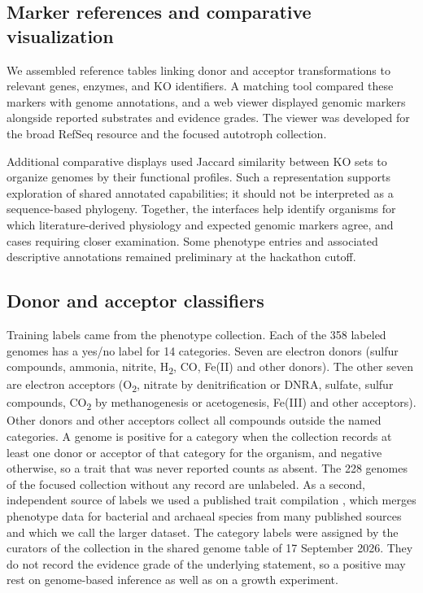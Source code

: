 \documentclass[10pt,a4paper,onecolumn]{article}
\begin{document}
\subsection{Marker references and comparative
visualization}\label{marker-references-and-comparative-visualization}

We assembled reference tables linking donor and acceptor transformations
to relevant genes, enzymes, and KO identifiers. A matching tool compared
these markers with genome annotations, and a web viewer displayed
genomic markers alongside reported substrates and evidence grades. The
viewer was developed for the broad RefSeq resource and the focused
autotroph collection.

Additional comparative displays used Jaccard similarity between KO sets
to organize genomes by their functional profiles. Such a representation
supports exploration of shared annotated capabilities; it should not be
interpreted as a sequence-based phylogeny. Together, the interfaces help
identify organisms for which literature-derived physiology and expected
genomic markers agree, and cases requiring closer examination. Some
phenotype entries and associated descriptive annotations remained
preliminary at the hackathon cutoff.

\subsection{Donor and acceptor
classifiers}\label{donor-and-acceptor-classifiers}

Training labels came from the phenotype collection. Each of the 358
labeled genomes has a yes/no label for 14 categories. Seven are electron
donors (sulfur compounds, ammonia, nitrite, H\textsubscript{2}, CO,
Fe(II) and other donors). The other seven are electron acceptors
(O\textsubscript{2}, nitrate by denitrification or DNRA, sulfate, sulfur
compounds, CO\textsubscript{2} by methanogenesis or acetogenesis,
Fe(III) and other acceptors). Other donors and other acceptors collect
all compounds outside the named categories. A genome is positive for a
category when the collection records at least one donor or acceptor of
that category for the organism, and negative otherwise, so a trait that
was never reported counts as absent. The 228 genomes of the focused
collection without any record are unlabeled. As a second, independent
source of labels we used a published trait compilation
\autocite{Madin2020}, which merges phenotype data for bacterial and
archaeal species from many published sources and which we call the
larger dataset. The category labels were assigned by the curators of the
collection in the shared genome table of 17 September 2026. They do not
record the evidence grade of the underlying statement, so a positive may
rest on genome-based inference as well as on a growth experiment.
\end{document}
